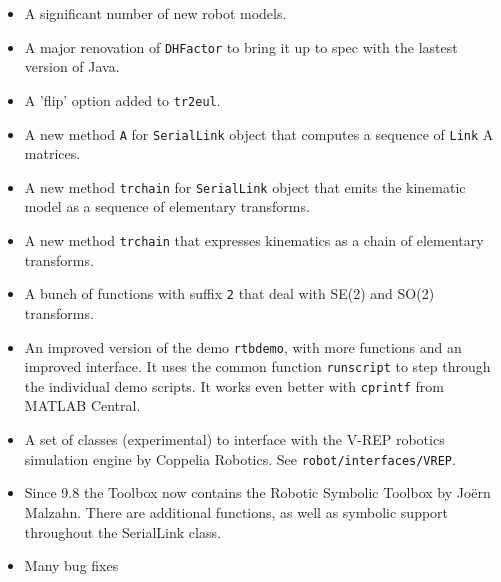 \documentclass[a4paper]{report}
\begin{document}
\begin{itemize}
\item A significant number of new robot models.
\item A major renovation of \texttt{DHFactor} to bring it up to spec with the lastest version of Java.
\item A 'flip' option added to \texttt{tr2eul}.
\item A new method \texttt{A} for \texttt{SerialLink} object that computes a sequence of \texttt{Link} A matrices.
\item A new method \texttt{trchain} for \texttt{SerialLink} object that emits the kinematic model as a sequence of elementary
transforms.
\item A new method \texttt{trchain} that expresses kinematics as a chain of elementary transforms.
\item A bunch of functions with suffix \texttt{2} that deal with SE(2) and SO(2) transforms.
\item An improved version of the demo \texttt{rtbdemo}, with more functions and an improved interface.  It uses the common
function \texttt{runscript} to step through the individual demo scripts.  It works even better with \texttt{cprintf} from MATLAB Central.
\item A set of classes (experimental) to interface with the V-REP robotics simulation engine by Coppelia Robotics.  See
\texttt{robot/interfaces/VREP}.
\item Since 9.8 the Toolbox now contains the Robotic Symbolic Toolbox
by Jo\"{e}rn Malzahn.  There are additional functions, as well as symbolic
support throughout the SerialLink class.
\item Many bug fixes
\end{itemize}
\end{document}
